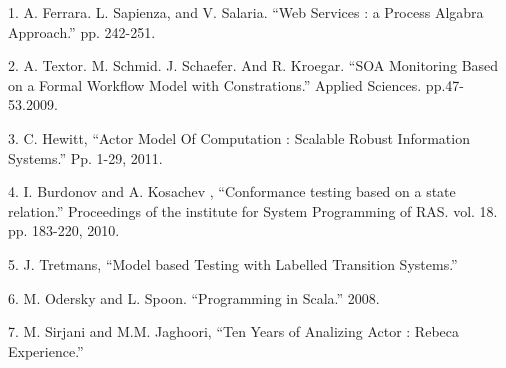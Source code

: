 \documentclass{jtetiproposalskripsi}
\begin{document}
\begin{thebibliography}{9}

1.  A. Ferrara. L. Sapienza, and V. Salaria. “Web Services : a Process Algabra Approach.” pp. 242-251.

2.	A. Textor. M. Schmid. J. Schaefer. And R. Kroegar. “SOA Monitoring Based on a Formal Workflow Model with Constrations.” Applied Sciences. pp.47-53.2009.

3.	C. Hewitt, “Actor Model Of Computation : Scalable Robust Information Systems.” Pp. 1-29, 2011.

4.	I. Burdonov and A. Kosachev , “Conformance testing based on a state relation.” Proceedings of the institute for System Programming  of RAS. vol.  18. pp. 183-220, 2010.

5.	J. Tretmans, “Model based Testing with Labelled Transition Systems.”

6.	M. Odersky and L. Spoon. “Programming in Scala.” 2008.

7.	M. Sirjani and M.M. Jaghoori, “Ten Years of Analizing Actor : Rebeca Experience.” 

\end{thebibliography}
\end{document}

